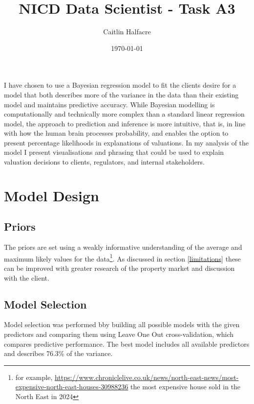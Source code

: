 \documentclass{scrartcl}
\author{Caitlin Halfacre}
\date{\today}
\title{NICD Data Scientist - Task A3}
\begin{document}
\maketitle
I have chosen to use a Bayesian regression model to fit the clients desire for a model that both describes more of the variance in the data than their existing model and maintains predictive accuracy. While Bayesian modelling is computationally and technically more complex than a standard linear regression model, the approach to prediction and inference is more intuitive, that is, in line with how the human brain processes probability, and enables the option to present percentage likelihoods in explanations of valuations. In my analysis of the model I present visualisations and phrasing that could be used to explain valuation decisions to clients, regulators, and internal stakeholders.

\section{Model Design}
\subsection{Priors}
The priors are set using a  weakly informative understanding of the average and maximum likely values for the data\footnote{for example, \url{https://www.chroniclelive.co.uk/news/north-east-news/most-expensive-north-east-houses-30988236} the most expensive house sold in the North East in 2024}. As discussed in section \ref{limitations} these can be improved with greater research of the property market and discussion with the client.

\subsection{Model Selection}
Model selection was performed bby building all possible models with the given predictors and comparing them using Leave One Out cross-validation, which compares predictive performance. The best model includes all available predictors and describes 76.3\% of the variance.
\end{document}
